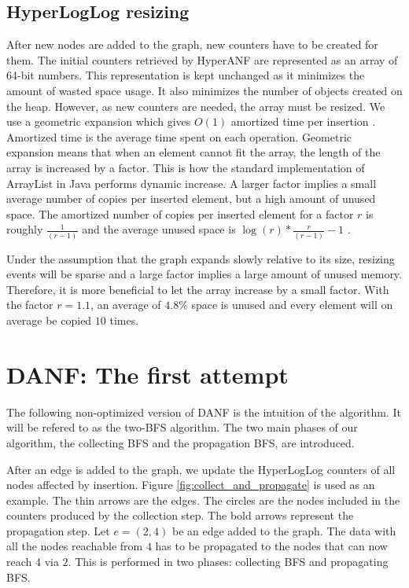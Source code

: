 \subsection{HyperLogLog resizing}
After new nodes are added to the graph, new counters have to be created for them. The initial counters retrieved by HyperANF are represented as an array of 64-bit numbers. This representation is kept unchanged as it minimizes the amount of wasted space usage. It also minimizes the number of objects created on the heap. However, as new counters are needed, the array must be resized. We use a geometric expansion which gives $O(1)$ amortized time per insertion \cite{dynamicarrays}. Amortized time is the average time spent on each operation. Geometric expansion means that when an element cannot fit the array, the length of the array is increased by a factor. This is how the standard implementation of ArrayList in Java performs dynamic increase. A larger factor implies a small average number of copies per inserted element, but a high amount of unused space. The amortized number of copies per inserted element for a factor $r$ is roughly $\frac{1}{(r-1)}$ and the average unused space is $\log(r)*\frac{r}{(r-1)} - 1$ \cite{dynamicarrays}.

Under the assumption that the graph expands slowly relative to its size, resizing events will be sparse and a large factor implies a large amount of unused memory. Therefore, it is more beneficial to let the array increase by a small factor. With the factor $r = 1.1$, an average of $4.8$\% space is unused and every element will on average be copied $10$ times.

\section{DANF: The first attempt}

The following non-optimized version of DANF is the intuition of the algorithm. It will be refered to as the two-BFS algorithm. The two main phases of our algorithm, the collecting BFS and the propagation BFS, are introduced. 

After an edge is added to the graph, we update the HyperLogLog counters of all nodes affected by insertion. Figure \ref{fig:collect_and_propagate} is used as an example. The thin arrows are the edges. The circles are the nodes included in the counters produced by the collection step. The bold arrows represent the propagation step. Let $e = (2,4)$ be an edge added to the graph. The data with all the nodes reachable from $4$ has to be propagated to the nodes that can now reach $4$ via $2$. This is performed in two phases: collecting BFS and propagating BFS.

